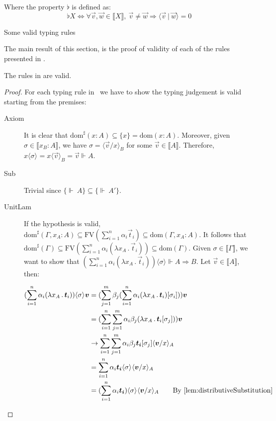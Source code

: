 \documentclass[runningheads,orivec,envcountsame,envcountsect]{llncs}
\newcommand\ansubst[2]{\ensuremath{\langle #1 \rangle_{#2}}}
\newcommand\dom[1]{\mathrm{dom}(#1)}
\newcommand\sdom[1]{\mathrm{dom}^{\sharp}(#1)}
\newcommand\FV[1]{\mathrm{FV}(#1)}
\def\scal#1#2{\langle{#1}~|~{#2}\rangle}
\def\Lam#1#2#3{\lambda#1_{#2}\,{.}\,#3} %
\def\Arr{\Rightarrow}
\def\sem#1{\llbracket#1\rrbracket}
\def\semr#1{\{{\real}~#1\}}
\def\real{\Vdash}
\begin{document}
\begin{table*}
    \parbox{\linewidth}{Where the property $\flat$ is defined as: 
    \[\flat X \iff \forall \vec v, \vec w\in\sem{X}, ~ \vec{v}\neq \vec w \Rightarrow \scal{\vec v}{\vec w} = 0
    \]
    }
    \caption{Some valid typing rules}
    \label{tab:TypingRules}
\end{table*}

The main result of this section, is the proof of validity of each of the rules presented in .

\begin{theorem}
    The rules in  are valid.
\end{theorem}

\begin{proof}
    For each typing rule in ~we have to show the typing judgement is valid starting from the premises:
    \begin{description}
    \item[Axiom] It is clear that $\sdom{x:A}\subseteq\{x\}=\dom{x:A}$. Moreover, given $\sigma\in\sem{x_B:A}$, we have $\sigma=\ansubst{\vec v/x}{B}$ for some $\vec{v}\in\sem{A}$. Therefore, $x\ansubst{\sigma}{}=x\ansubst{\vec v}{B}=\vec{v}\real A$.
    
    \item[Sub] Trivial since $\semr{A}\subseteq\semr{A'}$. 

    \item[UnitLam] If the hypothesis is valid, $\sdom{\Gamma,x_A:A}\subseteq \FV{\sum_{i=1}^{n}\alpha_i \vec t_i}\subseteq \dom{\Gamma,x_A:A}$. It follows that $\sdom{\Gamma}\subseteq \FV{\sum_{i=1}^{n}\alpha_i (\Lam{x}{A}{\vec t_i})}\subseteq \dom{\Gamma}$. Given $\sigma\in\sem{\Gamma}$, we want to show that $(\sum_{i=1}^{n}\alpha_i (\Lam{x}{A}{\vec t_i}))\ansubst{\sigma}{}\real A\Arr B$. Let $\vec v\in\sem{A}$, then:
    
    \begin{align*}
        (\sum_{i=1}^{n} \alpha_i(\Lam{x}{A}{\vec t_i}))\ansubst{\sigma}{} \vec v&= (\sum_{j=1}^{m} \beta_j (\sum_{i=1}^{n} \alpha_i (\Lam{x}{A}{\vec t_i}) [\sigma_i])) \vec{v} \\
        &= (\sum_{i=1}^{n}\sum_{j=1}^{m}\alpha_i\beta_j (\Lam{x}{A}{\vec t_i[\sigma_j]}))\vec v\\
        &\to \sum_{i=1}^{n}\sum_{j=1}^{m}\alpha_i\beta_j \vec{t_i}[\sigma_j]\ansubst{\vec v/x}{A}\\
        &=\sum_{i=1}^{n}\alpha_i \vec{t_i}\ansubst{\sigma}{}\ansubst{\vec v/x}{A}\\
        &=(\sum_{i=1}^{n}\alpha_i \vec{t_i})\ansubst{\sigma}{}\ansubst{\vec v/x}{A}\qquad{\text{By \Cref{lem:distributiveSubstitution}}}
    \end{align*}
    

\end{description}
\end{proof}
\end{document}
